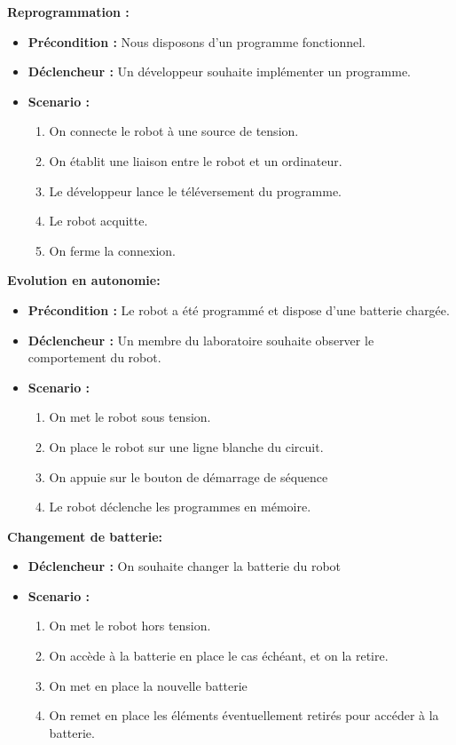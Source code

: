 		\textbf{Reprogrammation :}
		\begin{itemize}
			\item \textbf{Précondition :} Nous disposons d'un programme fonctionnel.
			\item \textbf{Déclencheur :} Un développeur souhaite implémenter un programme.
			\item \textbf{Scenario :}
			\begin{enumerate}
				\item On connecte le robot à une source de tension.
				\item On établit une liaison entre le robot et un ordinateur.
				\item Le développeur lance le téléversement du programme.
				\item Le robot acquitte.
				\item On ferme la connexion.
			\end{enumerate}
		\end{itemize}

		\textbf{Evolution en autonomie:}
		\begin{itemize}
			\item \textbf{Précondition :} Le robot a été programmé et dispose d'une batterie chargée.
			\item \textbf{Déclencheur :} Un membre du laboratoire souhaite observer le comportement du robot.
			\item \textbf{Scenario :}
			\begin{enumerate}
				\item On met le robot sous tension.
				\item On place le robot sur une ligne blanche du circuit.
				\item On appuie sur le bouton de démarrage de séquence
				\item Le robot déclenche les programmes en mémoire.
			\end{enumerate}
		\end{itemize}

		\textbf{Changement de batterie:}
		\begin{itemize}
			\item \textbf{Déclencheur :} On souhaite changer la batterie du robot
			\item \textbf{Scenario :}
			\begin{enumerate}
				\item On met le robot hors tension.
				\item On accède à la batterie en place le cas échéant, et on la retire.
				\item On met en place la nouvelle batterie
				\item On remet en place les éléments éventuellement retirés pour accéder à la batterie.
			\end{enumerate}
		\end{itemize}



